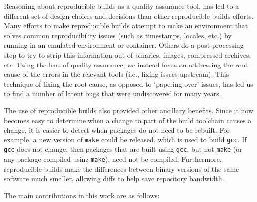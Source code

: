 Reasoning about reproducible builds as a quality assurance tool, has led to
a different set of design choices and decisions than other reproducible
builds efforts.  Many efforts to make reproducible builds attempt to make
an environment that solves common reproducibility issues (such as
timestamps, locales, etc.) by running in an emulated environment or
container.   Others do a post-processing step to try to strip this
information out of binaries, images, compressed archives, etc.  Using the
lens of quality assurance, we instead focus on addressing the root cause of
the errors in the relevant tools (i.e., fixing issues upstream).  This
technique of fixing the root cause, as opposed to `papering over' issues,
has led us to find a number of latent bugs that were undiscovered for many
years. 

The use of reproducible builds also provided other ancillary benefits.  Since
it now becomes easy to determine when a change to part of the build toolchain
causes a change, it is easier to detect when packages do not need to be 
rebuilt.  For example, a new version of {\tt make} could be released, which
is used to build {\tt gcc}.  If {\tt gcc} does not change, then packages
that are built using {\tt gcc}, but not {\tt make} (or any package compiled
using {\tt make}), need not be compiled.    Furthermore, reproducible builds make the differences between
binary versions of the same software much smaller, allowing diffs to help
save repository bandwidth.

The main contributions in this work are as follows:

